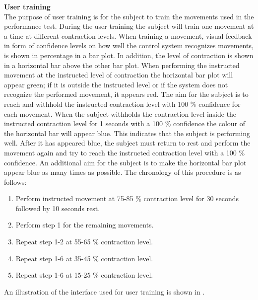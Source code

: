 \textbf{User training} \\ %
The purpose of user training is for the subject to train the movements used in the performance test. During the user training the subject will train one movement at a time at different contraction levels. When training a movement, visual feedback in form of confidence levels on how well the control system recognizes movements, is shown in percentage in a bar plot. In addition, the level of contraction is shown in a horizontal bar above the other bar plot. When performing the instructed movement at the instructed level of contraction the horizontal bar plot will appear green; if it is outside the instructed level or if the system does not recognize the performed movement, it appears red. The aim for the subject is to reach and withhold the instructed contraction level with 100 \% confidence for each movement. When the subject withholds the contraction level inside the instructed contraction level for 1 seconds with a 100 \% confidence the colour of the horizontal bar will appear blue. This indicates that the subject is performing well. After it has appeared blue, the subject must return to rest and perform the movement again and try to reach the instructed contraction level with a 100 \% confidence. An additional aim for the subject is to make the horizontal bar plot appear blue as many times as possible. The chronology of this procedure is as follows:

\begin{enumerate}
	\item Perform instructed movement at 75-85 \% contraction level for 30 seconds followed by 10 seconds rest.
	\item Perform step 1 for the remaining movements.
	\item Repeat step 1-2 at 55-65 \% contraction level.
	\item Repeat step 1-6 at 35-45 \% contraction level.
	\item Repeat step 1-6 at 15-25 \% contraction level.
\end{enumerate} 

An illustration of the interface used for user training is shown in .

